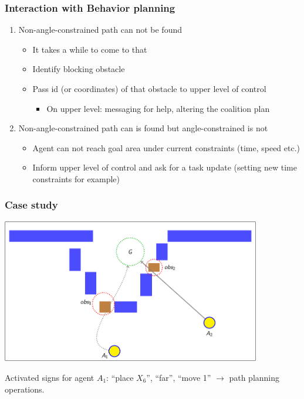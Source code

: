 \documentclass[default]{beamer}
\begin{document}
	\begin{frame}
		\frametitle{Interaction with Behavior planning}
		
		\begin{enumerate}
			\item Non-angle-constrained path can not be found
			\begin{itemize}
				\item It takes a while to come to that
				\item Identify blocking obstacle
				\item Pass id (or coordinates) of that obstacle to upper level of control
				\begin{itemize}
					\item On upper level: messaging for help, altering the coalition plan
				\end{itemize}
			\end{itemize}
			\item Non-angle-constrained path can is found but angle-constrained is not
			\begin{itemize}
				\item Agent can not reach goal area under current constraints (time, speed etc.)
				\item Inform upper level of control and ask for a task update (setting new time constraints for example)
			\end{itemize}
		\end{enumerate}
	\end{frame}
	
	\begin{frame}
		\frametitle{Case study}
		
		\begin{center}
			\includegraphics[page=1,width=0.85\textwidth]{examples/slides_colored}
		\end{center}
		\par\bigskip
		Activated signs for agent $A_1$: ``place $X_6$'', ``far'', ``move 1'' $\rightarrow$ \color{red} path planning operations.
	\end{frame}
	
\end{document}
